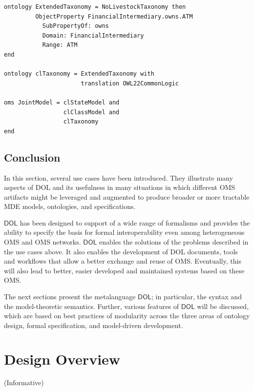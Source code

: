 \documentclass[10pt,fleqn,final]{scrreprt}
\newcommand*{\DOL}{\ensuremath{\mathsf{DOL}}\xspace}
\newcommand{\informative}[0]{{\begin{center}{\Large{(Informative})}\end{center}} \bigskip}
\newcommand{\clauseI}[1]{\chapter{#1} \informative }
\newenvironment{definitions}[0]{\medskip }{}
\begin{document}
\begin{definitions}
\begin{lstlisting}
ontology ExtendedTaxonomy = NoLivestockTaxonomy then 
         ObjectProperty FinancialIntermediary.owns.ATM
           SubPropertyOf: owns 
           Domain: FinancialIntermediary 
           Range: ATM
end

ontology clTaxonomy = ExtendedTaxonomy with 
                      translation OWL22CommonLogic

oms JointModel = clStateModel and 
                 clClassModel and 
                 clTaxonomy
end
\end{lstlisting}


\section{Conclusion}

In this section, several use cases have been introduced. They illustrate many aspects of DOL and its usefulness in many situations in which different OMS artifacts might be leveraged and augmented to produce broader or more tractable MDE models, ontologies, and specifications.

 \DOL has been designed to support of a wide range of formalisms and
provides the ability to specify the basis for formal interoperability even among heterogeneous OMS and OMS networks. \DOL enables the solutions of the problems described in the use cases above. It also enables the development of DOL documents, tools and workflows that 
allow  a better exchange and reuse of OMS. Eventually, this will also lead to better, easier developed and maintained systems based on these OMS.

The next sections present the metalanguage \DOL{}; in particular, the syntax and the model-theoretic semantics. Further, various features of \DOL will be discussed, which  are based on  best practices of modularity  across
 the three areas of ontology design, formal 
specification, and model-driven development.




\clauseI{Design Overview} \label{c:design}


\end{definitions}
\end{document}
